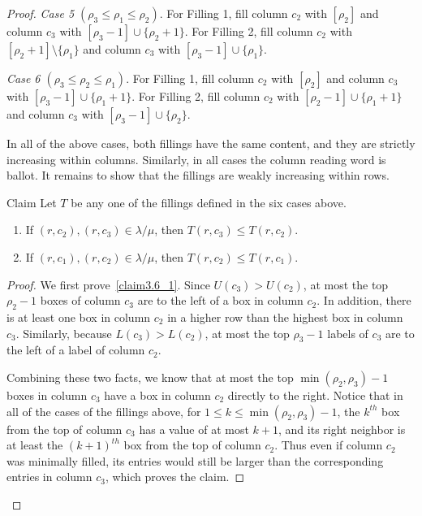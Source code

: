 \documentclass[ALCO,ThmDefs,Unicode,epreuves]{cedram}
\let\hypertargeta\hypertarget %
\newenvironment{Case}[1]{\par\vskip2pt\noindent%
\emph{#1}.}{\vskip2pt}
\newenvironment{claim}{\begin{enonce}{Claim}}{\end{enonce}}
\begin{document}
\begin{proof}
\begin{Case}
{\hypertargeta{prop3.5case_5}{Case 5} $(\rho_3\leq \rho_1 \leq \rho_2)$} 
For Filling 1, fill column $c_2$ with $[\rho_2]$ and column $c_3$ with $[\rho_3-1]\cup \{ \rho_2+1\}$. For Filling 2, fill column $c_2$ with $[\rho_2+1]\setminus \{\rho_1\}$ and column $c_3$ with $[\rho_3-1]\cup \{\rho_1\}$.
\end{Case}

\begin{Case}
{\hypertargeta{prop3.5case_6}{Case 6} $(\rho_3\leq \rho_2 \leq \rho_1)$} 
For Filling 1, fill column $c_2$ with $[\rho_2]$ and column $c_3$ with $[\rho_3-1]\cup \{\rho_1+1\}$. For Filling 2, fill column $c_2$ with $[\rho_2-1]\cup \{\rho_1+1\}$ and column $c_3$ with $[\rho_3-1]\cup\{ \rho_2\}$.
\end{Case}


In all of the above cases, both fillings have the same content, and they are strictly increasing within columns. Similarly, in all cases the column reading word is ballot. It remains to show that the fillings are weakly increasing within rows.


\begin{claim}
\label{claim:c2c3}
Let $T$ be any one of the fillings defined in the six cases above. 
\begin{enumerate}[label=(\Roman{*})]
\item\label{claim3.6_1} If $(r,c_2),(r,c_3)\in \lambda/\mu$, then $T(r,c_3) \leq T(r,c_2)$.
\item\label{claim3.6_2} If $(r,c_1),(r,c_2)\in \lambda/\mu$, then $T(r,c_2) \leq T(r,c_1)$.
\end{enumerate}
\end{claim}
\begin{proof}
We first prove~\ref{claim3.6_1}. Since $U(c_3)>U(c_2)$, at most the top $\rho_2-1$ boxes of column $c_3$ are to the left of a box in column $c_2$. In addition, there is at least one box in column $c_2$ in a higher row than the highest box in column $c_3$. Similarly, because $L(c_3)>L(c_2)$, at most the top $\rho_3-1$ labels of $c_3$ are to the left of a label of column $c_2$.

Combining these two facts, we know that at most the top $\min(\rho_2,\rho_3)-1$ boxes in column $c_3$ have a box in column $c_2$ directly to the right. Notice that in all of the cases of the fillings above, for $1\leq k\leq \min(\rho_2,\rho_3)-1$, the $k^{th}$ box from the top of column $c_3$ has a value of at most $k+1$, and its right neighbor is at least the $(k+1)^{th}$ box from the top of column $c_2$. Thus even if column $c_2$ was minimally filled, its entries would still be larger than the corresponding entries in column $c_3$, which proves the claim.


\end{proof}
\end{proof}
\end{document}
